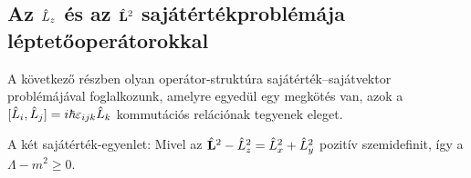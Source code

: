 %      
%      
%      
% 
    
    
  \subsection{Az $\hat{L}_z$ és az $\hat{\mathbf{L}}^2$ sajátértékproblémája léptetőoperátorokkal}
   
   A következő részben olyan operátor-struktúra sajátérték--sajátvektor problémájával foglalkozunk, amelyre egyedül egy megkötés van, azok a $[\hat{L}_i,\hat{L}_j]=i\hbar\varepsilon_{ijk}\hat{L}_k$ kommutációs relációnak tegyenek eleget. 
   
   A két sajátérték-egyenlet:
   Mivel az $\hat{\mathbf{L}}^2-\hat{L}_z^2=\hat{L}_x^2+\hat{L}_y^2$ pozitív szemidefinit, így a $\Lambda-m^2\geq0$. 
   
